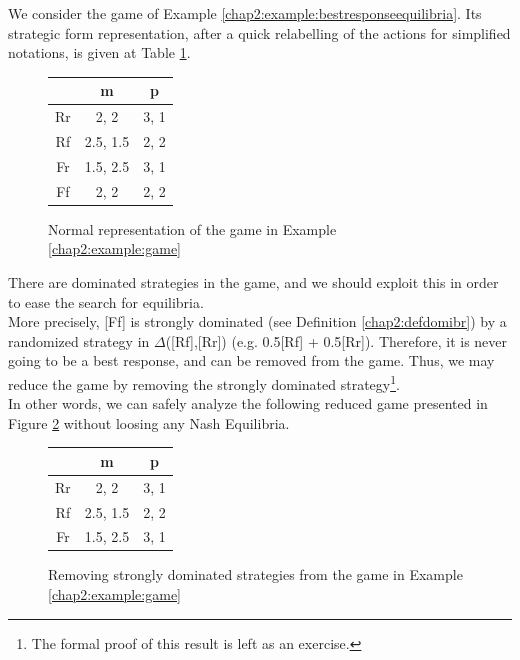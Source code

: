 \begin{example}
We consider the game of Example \ref{chap2:example:bestresponseequilibria}. Its strategic form representation, after a quick relabelling of the actions for simplified notations, is given at Table \ref{chap3:tablefromchap2}.


\begin{figure}[!ht]
\centering
\begin{tabular}{c|cc}
 & m & p \\
\hline
Rr & 2, 2 & 3, 1 \\
Rf & 2.5, 1.5 & 2, 2 \\
Fr & 1.5, 2.5 & 3, 1 \\
Ff & 2, 2 & 2, 2
\end{tabular}
\caption{Normal representation of the game in Example \ref{chap2:example:game}}
\label{chap3:tablefromchap2}
\end{figure}



There are dominated strategies in the game, and  we should exploit this in order to ease the search for equilibria.\\
More precisely, [Ff] is strongly dominated (see Definition \ref{chap2:defdomibr})  by a randomized strategy in $\Delta$([Rf],[Rr]) (e.g. 0.5[Rf] + 0.5[Rr]).
Therefore, it is never going to be a best response, and can be removed from the game.
Thus, we may reduce the game by removing the strongly dominated strategy\footnote{The formal proof of this result is left as an exercise.}.\\
In other words,  we can safely analyze the following reduced game presented in Figure \ref{chap3:tablefromchap2-reduced} without loosing any Nash Equilibria.
\begin{figure}[!ht]
\centering
\begin{tabular}{c|cc}
 & m & p \\
\hline
Rr & 2, 2 & 3, 1 \\
Rf & 2.5, 1.5 & 2, 2 \\
Fr & 1.5, 2.5 & 3, 1
\end{tabular}
\caption{Removing strongly dominated strategies from the game in Example \ref{chap2:example:game}}
\label{chap3:tablefromchap2-reduced}
\end{figure}


\end{example}
